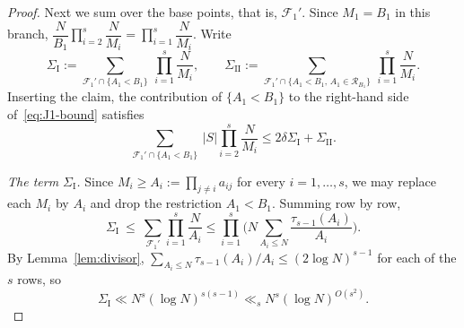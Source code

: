 \begin{proof}
Next we sum over the base points, that is, $\mathscr{F}_1'$.
Since $M_1=B_1$ in this branch, $\dfrac{N}{B_1}\prod_{i=2}^s\dfrac{N}{M_i}=\prod_{i=1}^s\dfrac{N}{M_i}$.
Write
\[
\Sigma_{\mathrm I}:=\sum_{\mathscr{F}_1'\cap\{A_1<B_1\}}\ \prod_{i=1}^s\frac{N}{M_i},\qquad
\Sigma_{\mathrm{II}}:=\sum_{\mathscr{F}_1'\cap\{A_1<B_1,\,A_1\in\mathcal{R}_{B_1}\}}\ \prod_{i=1}^s\frac{N}{M_i}.
\]
Inserting the claim, the contribution of $\{A_1<B_1\}$ to the right-hand side of~\eqref{eq:J1-bound} satisfies
\[
\sum_{\mathscr{F}_1'\cap\{A_1<B_1\}}\ |S|\prod_{i=2}^s\frac{N}{M_i}
\leq 2\delta\Sigma_{\mathrm I}+\Sigma_{\mathrm{II}}.
\]

\smallskip\noindent\emph{The term $\Sigma_{\mathrm I}$.}
Since $M_i\geq A_i:=\prod_{j\neq i}a_{ij}$ for every $i=1,\ldots,s$, we may replace each $M_i$ by $A_i$ and drop the restriction $A_1<B_1$.
Summing row by row,
\[
\Sigma_{\mathrm I}\ \leq\ \sum_{\mathscr{F}_1'}\prod_{i=1}^s\frac{N}{A_i}
\leq\prod_{i=1}^s\Big(N\sum_{A_i\leq N}\frac{\tau_{s-1}(A_i)}{A_i}\Big).
\]
By Lemma~\ref{lem:divisor}, $\sum_{A_i\leq N}\tau_{s-1}(A_i)/A_i\leq(2\log N)^{s-1}$ for each of the $s$ rows, so
\[
\Sigma_{\mathrm I}\ll N^s(\log N)^{s(s-1)}\ll_s N^s(\log N)^{O(s^2)}.
\]


\end{proof}
